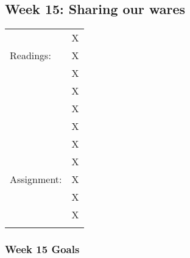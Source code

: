 \documentclass[]{article}
\begin{document}
\subsection{Week 15: Sharing our wares}\label{week-15-sharing-our-wares}

\begin{longtable}[c]{@{}ll@{}}
\toprule\addlinespace
& X
\\\addlinespace
Readings: & X
\\\addlinespace
& X
\\\addlinespace
& X
\\\addlinespace
& X
\\\addlinespace
& X
\\\addlinespace
& X
\\\addlinespace
& X
\\\addlinespace
Assignment: & X
\\\addlinespace
& X
\\\addlinespace
& X
\\\addlinespace
\bottomrule
\end{longtable}

\subsubsection{Week 15 Goals}\label{week-15-goals}
\end{document}
